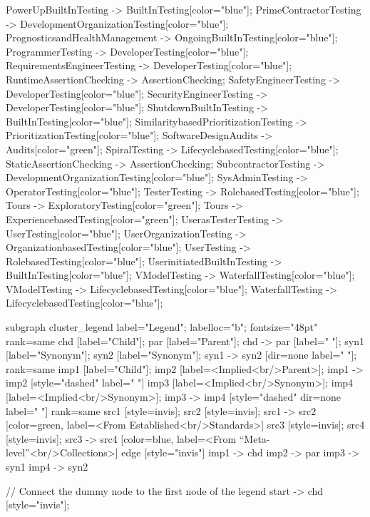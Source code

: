 \documentclass{article}
\begin{document}
{PowerUpBuiltInTesting -> BuiltInTesting[color="blue"];
PrimeContractorTesting -> DevelopmentOrganizationTesting[color="blue"];
PrognosticsandHealthManagement -> OngoingBuiltInTesting[color="blue"];
ProgrammerTesting -> DeveloperTesting[color="blue"];
RequirementsEngineerTesting -> DeveloperTesting[color="blue"];
RuntimeAssertionChecking -> AssertionChecking;
SafetyEngineerTesting -> DeveloperTesting[color="blue"];
SecurityEngineerTesting -> DeveloperTesting[color="blue"];
ShutdownBuiltInTesting -> BuiltInTesting[color="blue"];
SimilaritybasedPrioritizationTesting -> PrioritizationTesting[color="blue"];
SoftwareDesignAudits -> Audits[color="green"];
SpiralTesting -> LifecyclebasedTesting[color="blue"];
StaticAssertionChecking -> AssertionChecking;
SubcontractorTesting -> DevelopmentOrganizationTesting[color="blue"];
SysAdminTesting -> OperatorTesting[color="blue"];
TesterTesting -> RolebasedTesting[color="blue"];
Tours -> ExploratoryTesting[color="green"];
Tours -> ExperiencebasedTesting[color="green"];
UserasTesterTesting -> UserTesting[color="blue"];
UserOrganizationTesting -> OrganizationbasedTesting[color="blue"];
UserTesting -> RolebasedTesting[color="blue"];
UserinitiatedBuiltInTesting -> BuiltInTesting[color="blue"];
VModelTesting -> WaterfallTesting[color="blue"];
VModelTesting -> LifecyclebasedTesting[color="blue"];
WaterfallTesting -> LifecyclebasedTesting[color="blue"];

subgraph cluster_legend {
    label="Legend";
    labelloc="b";
    fontsize="48pt"
    {
        rank=same
        chd [label="Child"];
        par [label="Parent"];
        chd -> par [label="                "];
        syn1 [label="Synonym"];
        syn2 [label="Synonym"];
        syn1 -> syn2 [dir=none label="                "];
    }
    {
        rank=same
        imp1 [label="Child"];
        imp2 [label=<Implied<br/>Parent>];
        imp1 -> imp2 [style="dashed" label="                "]
        imp3 [label=<Implied<br/>Synonym>];
        imp4 [label=<Implied<br/>Synonym>];
        imp3 -> imp4 [style="dashed" dir=none label="                "]
    }
{
rank=same
src1 [style=invis];
src2 [style=invis];
src1 -> src2 [color=green, label=<From Established<br/>Standards>]
src3 [style=invis];
src4 [style=invis];
src3 -> src4 [color=blue, label=<From ``Meta-level''<br/>Collections>]
}
    edge [style="invis"]
    imp1 -> chd
    imp2 -> par
    imp3 -> syn1
    imp4 -> syn2
}

// Connect the dummy node to the first node of the legend
start -> chd [style="invis"];
}
\end{document}
